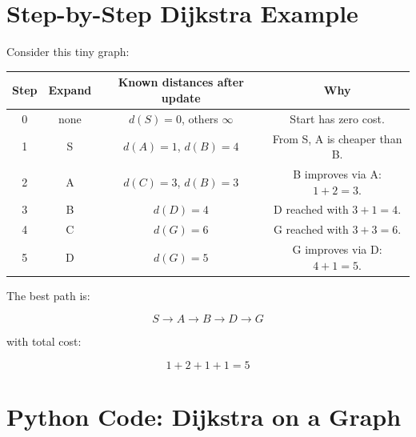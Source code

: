 \documentclass[11pt,a4paper]{article}
\newcommand{\nodecircle}[4]{
  \node[circle,draw=#3,fill=#3!12,minimum size=9mm,thick] (#1) at #2 {\small #4};
}
\begin{document}
\section{Step-by-Step Dijkstra Example}

Consider this tiny graph:

\begin{center}
\end{center}

\begin{center}
\begin{tabular}{c c c c}
\toprule
\textbf{Step} & \textbf{Expand} & \textbf{Known distances after update} & \textbf{Why}\\
\midrule
0 & none & $d(S)=0$, others $\infty$ & Start has zero cost.\\
1 & S & $d(A)=1$, $d(B)=4$ & From S, A is cheaper than B.\\
2 & A & $d(C)=3$, $d(B)=3$ & B improves via A: $1+2=3$.\\
3 & B & $d(D)=4$ & D reached with $3+1=4$.\\
4 & C & $d(G)=6$ & G reached with $3+3=6$.\\
5 & D & $d(G)=5$ & G improves via D: $4+1=5$.\\
\bottomrule
\end{tabular}
\end{center}

The best path is:

\[
S \rightarrow A \rightarrow B \rightarrow D \rightarrow G
\]

with total cost:

\[
1+2+1+1=5
\]

\section{Python Code: Dijkstra on a Graph}
\end{document}
